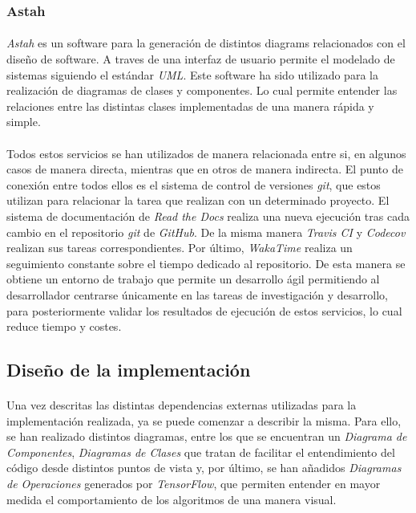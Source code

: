 \documentclass{subfiles}
\begin{document}
        \subsubsection{Astah}
        \label{sec:astah}

          \paragraph{}
          \emph{Astah} es un software para la generación de distintos diagrams relacionados con el diseño de software. A traves de una interfaz de usuario permite el modelado de sistemas siguiendo el estándar \emph{UML}. Este software ha sido utilizado para la realización de diagramas de clases y componentes. Lo cual permite entender las relaciones entre las distintas clases implementadas de una manera rápida y simple.

        \paragraph{}
        Todos estos servicios se han utilizados de manera relacionada entre si, en algunos casos de manera directa, mientras que en otros de manera indirecta. El punto de conexión entre todos ellos es el sistema de control de versiones \emph{git}, que estos utilizan para relacionar la tarea que realizan con un determinado proyecto. El sistema de documentación de \emph{Read the Docs} realiza una nueva ejecución tras cada cambio en el repositorio \emph{git} de \emph{GitHub}. De la misma manera \emph{Travis CI} y \emph{Codecov} realizan sus tareas correspondientes. Por último, \emph{WakaTime} realiza un seguimiento constante sobre el tiempo dedicado al repositorio. De esta manera se obtiene un entorno de trabajo que permite un desarrollo ágil permitiendo al desarrollador centrarse únicamente en las tareas de investigación y desarrollo, para posteriormente validar los resultados de ejecución de estos servicios, lo cual reduce tiempo y costes.

      \subsection{Diseño de la implementación}
      \label{sec:implementation_design}

        \paragraph{}
        Una vez descritas las distintas dependencias externas utilizadas para la implementación realizada, ya se puede comenzar a describir la misma. Para ello, se han realizado distintos diagramas, entre los que se encuentran un \emph{Diagrama de Componentes}, \emph{Diagramas de Clases} que tratan de facilitar el entendimiento del código desde distintos puntos de vista y, por último, se han añadidos \emph{Diagramas de Operaciones} generados por \emph{TensorFlow}, que permiten entender en mayor medida el comportamiento de los algoritmos de una manera visual.
\end{document}
